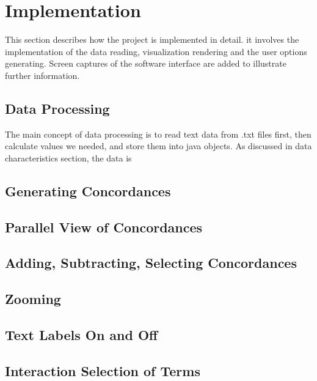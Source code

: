 \clearpage
\section{Implementation}
This section describes how the project is implemented in detail. it involves the implementation of the data reading, visualization rendering and the user options generating. Screen captures of the software interface are added to illustrate further information.

\subsection{Data Processing}

The main concept of data processing is to read text data from .txt files first, then calculate values we needed, and store them into java objects. As discussed in data characteristics section, the data is  

\subsection{Generating Concordances}

\subsection{Parallel View of Concordances}

\subsection{Adding, Subtracting, Selecting Concordances}

\subsection{Zooming}

\subsection{Text Labels On and Off}

\subsection{Interaction Selection of Terms}

